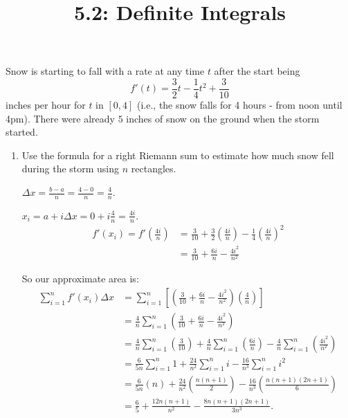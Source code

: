 \documentclass[handout, nooutcomes]{ximera}
\title{5.2: Definite Integrals}
\begin{document}
\begin{abstract}

\end{abstract}
\maketitle




\begin{problem}
Snow is starting to fall with a rate at any time $t$ after the start being 
$$ f'(t) = \frac{3}{2} t - \frac{1}{4} t^2 + \frac{3}{10} $$
inches per hour for $t$ in $[0,4]$ (i.e., the snow falls for 4 hours - from noon until 4pm).  
There were already $5$ inches of snow on the ground when the storm started.  
	\begin{enumerate}
	
	\item  Use the formula for a right Riemann sum to estimate how much snow fell during the storm using $n$ rectangles.
		\begin{freeResponse}
		$\Delta x = \frac{b-a}{n} = \frac{4-0}{n} = \frac{4}{n}$.
		
		$x_i = a + i \Delta x = 0 + i \frac{4}{n} = \frac{4i}{n}$.
			\begin{align*}
			f'(x_i) = f' \left( \frac{4i}{n} \right) &= \frac{3}{10} + \frac{3}{2} \left( \frac{4i}{n} \right) - \frac{1}{4} \left( \frac{4i}{n} \right)^2  \\
			&= \frac{3}{10} + \frac{6i}{n} - \frac{4i^2}{n^2}
			\end{align*}
			
		So our approximate area is:
			\begin{align*}
			\sum_{i=1}^n f'(x_i) \Delta x &= \sum_{i=1}^n \left[ \left( \frac{3}{10} + \frac{6i}{n} - \frac{4i^2}{n^2} \right) \left( \frac{4}{n} \right) \right]  \\
			&= \frac{4}{n} \sum_{i=1}^n \left( \frac{3}{10} + \frac{6i}{n} - \frac{4i^2}{n^2} \right)  \\
			&= \frac{4}{n} \sum_{i=1}^n \left( \frac{3}{10} \right) + \frac{4}{n} \sum_{i=1}^n \left( \frac{6i}{n} \right) - \frac{4}{n} \sum_{i=1}^n \left( \frac{4i^2}{n^2} \right)  \\
			&= \frac{6}{5n} \sum_{i=1}^n 1 + \frac{24}{n^2} \sum_{i=1}^n i - \frac{16}{n^3} \sum_{i=1}^n i^2  \\
			&= \frac{6}{5n} (n) + \frac{24}{n^2} \left( \frac{n(n+1)}{2} \right) - \frac{16}{n^3} \left( \frac{n(n+1)(2n+1)}{6} \right)  \\
			&= \frac{6}{5} + \frac{12n(n+1)}{n^2} - \frac{8n(n+1)(2n+1)}{3n^3}.
			\end{align*}
		\end{freeResponse}
		

\end{enumerate}
\end{problem}
\end{document}
